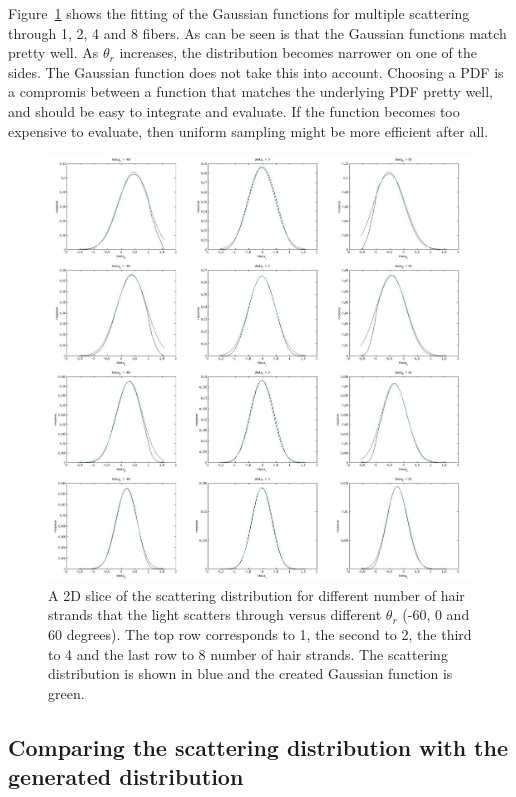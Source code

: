 \documentclass[11pt,a4paper]{report}
\begin{document}
Figure~\ref{fitting} shows the fitting of the Gaussian functions for multiple scattering through 1, 2, 4 and 8 fibers. As can be seen is that the Gaussian functions match pretty well. As $\theta_r$ increases, the distribution becomes narrower on one of the sides. The Gaussian function does not take this into account. Choosing a PDF is a compromis between a function that matches the underlying PDF pretty well, and should be easy to integrate and evaluate. If the function becomes too expensive to evaluate, then uniform sampling might be more efficient after all.


\begin{figure}[h]
\begin{center}
\includegraphics[scale=0.20]{images/graphfitting/fitting_combined.jpg}
\caption{A 2D slice of the scattering distribution for different number of hair strands that the light scatters through versus different $\theta_r$ (-60, 0 and 60 degrees). The top row corresponds to 1, the second to 2, the third to 4 and the last row to 8 number of hair strands. The scattering distribution is shown in blue and the created Gaussian function is green.}
\label{fitting}

\end{center}
\end{figure}





\subsection{Comparing the scattering distribution with the generated distribution}
\end{document}
